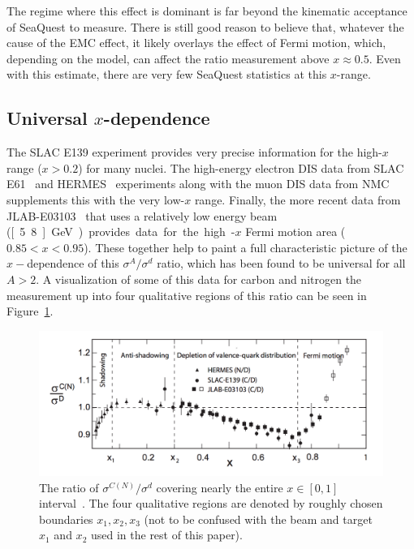 The regime where this effect is dominant is far beyond the kinematic acceptance of SeaQuest to measure. There is still good reason to believe that, whatever the cause of the EMC effect, it likely overlays the effect of Fermi motion, which, depending on the model, can affect the ratio measurement above $x\approx0.5$. Even with this estimate, there are very few SeaQuest statistics at this $x$-range.

\subsection{\texorpdfstring{Universal $x$-dependence}{Universal x-dependence}}

The SLAC E139 experiment provides very precise information for the high-$x$ range ($x>0.2$) for many nuclei. The high-energy electron DIS data from SLAC E61~\cite{Stein:1975yy} and HERMES~\cite{Ackerstaff:1999ac} experiments along with the muon DIS data from NMC~\cite{Amaudruz:1991nw} supplements this with the very low-$x$ range. Finally, the more recent data from JLAB-E03103~\cite{Seely:2009gt} that uses a relatively low energy beam (\unit[5.8]{GeV}) provides data for the high-$x$ Fermi motion area ($0.85<x<0.95$). These together help to paint a full characteristic picture of the $x-$dependence of this $\sigma^A/\sigma^d$ ratio, which has been found to be universal for all $A>2$. A visualization of some of this data for carbon and nitrogen  the measurement up into four qualitative regions of this ratio can be seen in Figure~\ref{fig:emc-regions}.
\begin{figure}
	\centering
	\includegraphics[width=\textwidth]{figures/background/emc-regions.png}
	\caption{The ratio of $\sigma^{C(N)}/\sigma^d$ covering nearly the entire $x\in[0,1]$ interval~\cite{Rith:2014tma}. The four qualitative regions are denoted by roughly chosen boundaries $x_1, x_2, x_3$ (not to be confused with the beam and target $x_1$ and $x_2$ used in the rest of this paper).}
	\label{fig:emc-regions}
\end{figure}
